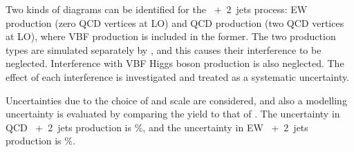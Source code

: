 Two kinds of diagrams can be identified for the \WW~+~2~jets process: EW production (zero 
QCD vertices at LO) and QCD production (two QCD vertices at LO), where VBF \WW production is 
included in the former. The two production types are simulated separately by \sherpa, and 
this causes their interference to be neglected. Interference with VBF Higgs boson production 
is also neglected. The effect of each interference is investigated and treated as a 
systematic uncertainty.

Uncertainties due to the choice of \mur and \muf scale are considered, and also a modelling 
uncertainty is evaluated by comparing the \sherpa yield to that of 
. The uncertainty in QCD \WW~+~2~jets production is \%, 
and the uncertainty in EW \WW~+~2~jets production is \%.

